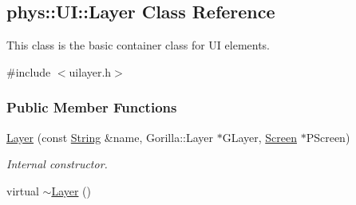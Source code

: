 \hypertarget{classphys_1_1UI_1_1Layer}{
\subsection{phys::UI::Layer Class Reference}
\label{classphys_1_1UI_1_1Layer}
}


This class is the basic container class for UI elements.  




{\ttfamily \#include $<$uilayer.h$>$}

\subsubsection*{Public Member Functions}
\begin{DoxyCompactItemize}
\item 
\hyperlink{classphys_1_1UI_1_1Layer_a26fd46d043fa1786a543b4c6b3863643}{Layer} (const \hyperlink{namespacephys_aa03900411993de7fbfec4789bc1d392e}{String} \&name, Gorilla::Layer $\ast$GLayer, \hyperlink{classphys_1_1UI_1_1Screen}{Screen} $\ast$PScreen)
\begin{DoxyCompactList}\small\item\em Internal constructor. \item\end{DoxyCompactList}\item 
\hypertarget{classphys_1_1UI_1_1Layer_a02f12501f3efbb5b06d59bfc04fab50d}{
virtual \hyperlink{classphys_1_1UI_1_1Layer_a02f12501f3efbb5b06d59bfc04fab50d}{$\sim$Layer} ()}
\label{classphys_1_1UI_1_1Layer_a02f12501f3efbb5b06d59bfc04fab50d}


\end{DoxyCompactItemize}
